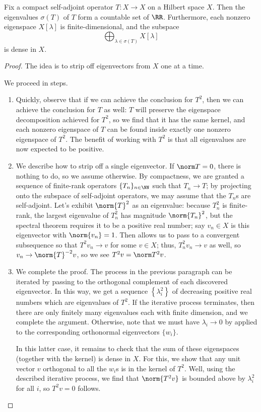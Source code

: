 \documentclass[notes.tex]{subfiles}
\begin{document}
\begin{theorem} \label{thm:hs}
	Fix a compact self-adjoint operator $T\colon X\to X$ on a Hilbert space $X$. Then the eigenvalues $\sigma(T)$ of $T$ form a countable set of $\RR$. Furthermore, each nonzero eigenspace $X[\lambda]$ is finite-dimensional, and the subspace
	\[\bigoplus_{\lambda\in\sigma(T)}X[\lambda]\]
	is dense in $X$.
\end{theorem}
\begin{proof}
	The idea is to strip off eigenvectors from $X$ one at a time.
	
	We proceed in steps.
	\begin{enumerate}
		\item Quickly, observe that if we can achieve the conclusion for $T^2$, then we can achieve the conclusion for $T$ as well: $T$ will preserve the eigenspace decomposition achieved for $T^2$, so we find that it has the same kernel, and each nonzero eigenspace of $T$ can be found inside exactly one nonzero eigenspace of $T^2$. The benefit of working with $T^2$ is that all eigenvalues are now expected to be positive.

		\item We describe how to strip off a single eigenvector. If $\norm T=0$, there is nothing to do, so we assume otherwise. By compactness, we are granted a sequence of finite-rank operators $\{T_n\}_{n\in\NN}$ such that $T_n\to T$; by projecting onto the subspace of self-adjoint operators, we may assume that the $T_n$s are self-adjoint. Let's exhibit $\norm{T}^2$ as an eigenvalue: because $T_n^2$ is finite-rank, the largest eigenvalue of $T_n^2$ has magnitude $\norm{T_n}^2$, but the spectral theorem requires it to be a positive real number; say $v_n\in X$ is this eigenvector with $\norm {v_n}=1$. Then  allows us to pass to a convergent subsequence so that $T^2v_n\to v$ for some $v\in X$; thus, $T_n^2v_n\to v$ as well, so $v_n\to\norm{T}^{-2}v$, so we see $T^2v=\norm T^2v$.

		\item We complete the proof. The process in the previous paragraph can be iterated by passing to the orthogonal complement of each discovered eigenvector. In this way, we get a sequence $\left\{\lambda_i^2\right\}$ of decreasing positive real numbers which are eigenvalues of $T^2$. If the iterative process terminates, then there are only finitely many eigenvalues each with finite dimension, and we complete the argument. Otherwise, note that we must have $\lambda_i\to0$ by  applied to the corresponding orthonormal eigenvectors $\{w_i\}$.

		In this latter case, it remains to check that the sum of these eigenspaces (together with the kernel) is dense in $X$. For this, we show that any unit vector $v$ orthogonal to all the $w_i$s is in the kernel of $T^2$. Well, using the described iterative process, we find that $\norm{T^2v}$ is bounded above by $\lambda_i^2$ for all $i$, so $T^2v=0$ follows.
		\qedhere
	\end{enumerate}
\end{proof}
\end{document}
